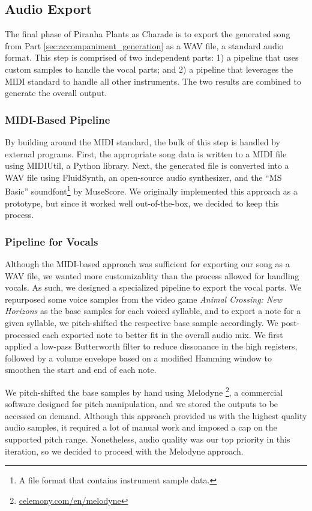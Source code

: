 \subsection{Audio Export}
\label{sec:audio_export}

The final phase of Piranha Plants as Charade is to export the generated song from Part \ref{sec:accompaniment_generation} as a WAV file, a standard audio format. This step is comprised of two independent parts: 1) a pipeline that uses custom samples to handle the vocal parts; and 2) a pipeline that leverages the MIDI standard to handle all other instruments. The two results are combined to generate the overall output.

\subsubsection{MIDI-Based Pipeline}

By building around the MIDI standard, the bulk of this step is handled by external programs. First, the appropriate song data is written to a MIDI file using MIDIUtil, a Python library. Next, the generated file is converted into a WAV file using FluidSynth, an open-source audio synthesizer, and the ``MS Basic'' soundfont\footnote{A file format that contains instrument sample data.} by MuseScore. We originally implemented this approach as a prototype, but since it worked well out-of-the-box, we decided to keep this process.

\subsubsection{Pipeline for Vocals}

Although the MIDI-based approach was sufficient for exporting our song as a WAV file, we wanted more customizablity than the process allowed for handling vocals. As such, we designed a specialized pipeline to export the vocal parts. We repurposed some voice samples from the video game \emph{Animal Crossing: New Horizons} as the base samples for each voiced syllable, and to export a note for a given syllable, we pitch-shifted the respective base sample accordingly. We post-processed each exported note to better fit in the overall audio mix. We first applied a low-pass Butterworth filter to reduce dissonance in the high registers, followed by a volume envelope based on a modified Hamming window to smoothen the start and end of each note.

We pitch-shifted the base samples by hand using Melodyne \footnote{\href{https://www.celemony.com/en/melodyne}{celemony.com/en/melodyne}}, a commercial software designed for pitch manipulation, and we stored the outputs to be accessed on demand. Although this approach provided us with the highest quality audio samples, it required a lot of manual work and imposed a cap on the supported pitch range. Nonetheless, audio quality was our top priority in this iteration, so we decided to proceed with the Melodyne approach.
